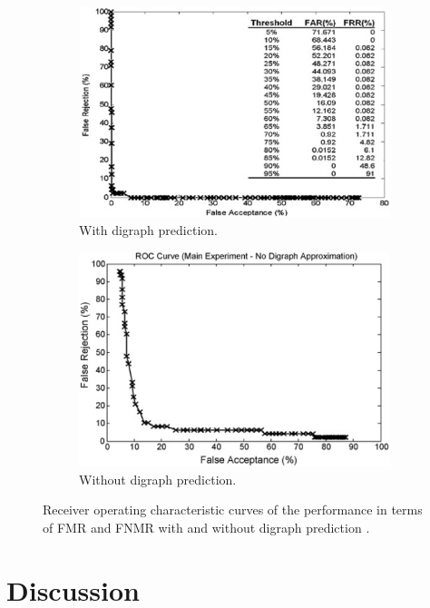 \documentclass[informationsecurity]{gucmasterproject}
\begin{document}
\begin{figure}[!tbp]
  \begin{subfigure}[b]{0.5\textwidth}
    \includegraphics[width=\textwidth]{ahmed/roc}
    \caption{With digraph prediction.}
    \label{fig:ahmed-withdi}
  \end{subfigure}
  \hfill
  \begin{subfigure}[b]{0.5\textwidth}
    \includegraphics[width=\textwidth]{ahmed/without-di}
    \caption{Without digraph prediction.}
    \label{fig:ahmed-withoutdi}
  \end{subfigure}
  \caption{Receiver operating characteristic curves of the performance in terms of FMR and FNMR with and without digraph prediction \cite{Ahmed}.}
\end{figure}

\section{Discussion}
\label{sec:ahmed-discussion}
\end{document}
